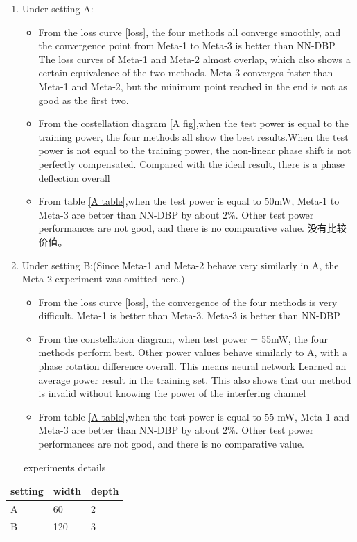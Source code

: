 \begin{enumerate}
\item Under setting A:
\begin{itemize}
\item From the loss curve \ref{loss}, the four methods all converge smoothly, and the convergence point from Meta-1 to Meta-3 is better than NN-DBP. 
The loss curves of Meta-1 and Meta-2 almost overlap, which also shows a certain equivalence of the two methods. Meta-3 converges faster than Meta-1 and Meta-2, 
but the minimum point reached in the end is not as good as the first two.
\item From the costellation diagram \ref{A fig},when the test power is equal to the training power, the four methods all show the best results.When the test 
power is not equal to the training power, the non-linear phase shift is not perfectly compensated. Compared with the ideal result, there is a phase deflection overall
\item From table \ref{A table},when the test power is equal to 50mW, Meta-1 to Meta-3 are better than NN-DBP by about $2\%$. 
Other test power performances are not good, and there is no comparative value.
没有比较价值。
\end{itemize}
\item Under setting B:(Since Meta-1 and Meta-2 behave very similarly in A, the Meta-2 experiment was omitted here.)
\begin{itemize}
\item From the loss curve \ref{loss}, the convergence of the four methods is very difficult. Meta-1 is better than Meta-3. Meta-3 is better than NN-DBP
\item From the constellation diagram, when test power = 55mW, the four methods perform best. Other power values behave similarly to A, with a phase rotation difference overall. This means neural network
Learned an average power result in the training set. This also shows that our method is invalid without knowing the power of the interfering channel
\item From table \ref{A table},when the test power is equal to 55 mW, Meta-1 and Meta-3 are better than NN-DBP by about $2\%$. 
Other test power performances are not good, and there is no comparative value.
\end{itemize}
\end{enumerate}

\begin{table}[htbp]
  \centering
  \begin{tabular}{lll}
    \hline
    setting       & width & depth \\
    \hline
    A           &  60   &   2   \\
    \hline
    B           &  120  &   3   \\
    \hline
  \end{tabular}
  \caption{experiments details}
  \label{NN setting}
\end{table}

